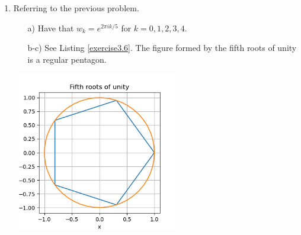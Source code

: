 \begin{enumerate}
  \item Referring to the previous problem.
        \begin{itemize}
          \item[a)] Have that $w_{k} = e^{2\pi ik/5}$ for $k=0,1,2,3,4$.
          \item[b-c)] See Listing \ref{exercise3.6}. The figure formed by the fifth roots of unity is a regular pentagon.
        \end{itemize}

        

        \begin{marginfigure}
          \includegraphics[width=7.5cm, height=7.0cm]{ch03/figures/roots}
        \end{marginfigure}


\end{enumerate}
